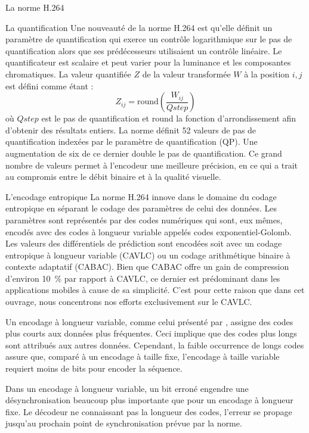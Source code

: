 \documentclass[letterpaper, twoside, 12pt,memoire]{thETS}
\begin{document}
\begin{chapter}{La norme H.264}
\begin{section}{La quantification}
Une nouveauté de la norme H.264 est qu'elle définit un paramètre de
quantification qui exerce un contrôle logarithmique sur le pas de quantification
alors que ses prédécesseurs utilisaient un contrôle linéaire. Le quantificateur
est scalaire et peut varier pour la luminance et les composantes chromatiques.
La valeur quantifiée $Z$ de la valeur transformée $W$ à la position $i,j$ est
défini comme étant :
\begin{equation}
Z_{ij} = \text{round}\left(\frac{W_{ij}}{Qstep}\right)
\end{equation}
où $Qstep$ est le pas de quantification et round la fonction d'arrondissement
afin d'obtenir des résultats entiers. La norme définit 52 valeurs de pas de
quantification indexées par le paramètre de quantification (QP). Une
augmentation de six de ce dernier double le pas de quantification. Ce grand
nombre de valeurs permet à l'encodeur une meilleure précision, en ce qui a trait
au compromis entre le débit binaire et à la qualité visuelle.
\end{section}

\begin{section}{L'encodage entropique}
La norme H.264 innove dans le domaine du codage entropique en séparant le codage
des paramètres de celui des données. Les paramètres sont représentés par des
codes numériques qui sont, eux mêmes, encodés avec des codes à longueur variable
appelés codes exponentiel-Golomb. Les valeurs des différentiels de prédiction
sont encodées soit avec un codage entropique à longueur variable (CAVLC) ou un
codage arithmétique binaire à contexte adaptatif (CABAC). Bien que CABAC offre
un gain de compression d'environ 10~\% par rapport à CAVLC, ce dernier est
prédominant dans les applications mobiles à cause de sa simplicité. C'est pour
cette raison que dans cet ouvrage, nous concentrons nos efforts exclusivement
sur le CAVLC.

Un encodage à longueur variable, comme celui présenté par \citep{huffman1952},
assigne des codes plus courts aux données plus fréquentes. Ceci implique que des
codes plus longs sont attribués aux autres données. Cependant, la faible
occurrence de longs codes assure que, comparé à un encodage à taille fixe,
l'encodage à taille variable requiert moins de bits pour encoder la séquence.

Dans un encodage à longueur variable, un bit erroné engendre une
désynchronisation beaucoup plus importante que pour un encodage à longueur
fixe. Le décodeur ne connaissant pas la longueur des codes, l'erreur se propage
jusqu'au prochain point de synchronisation prévue par la norme.
\end{section}


\end{chapter}
\end{document}
